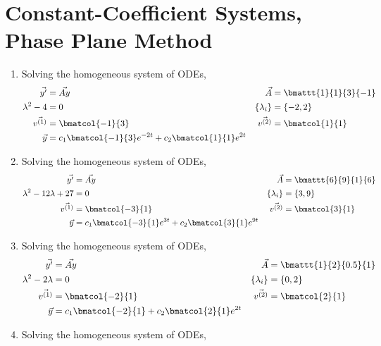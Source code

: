 \section{Constant-Coefficient Systems, Phase Plane Method}
\begin{enumerate}
\item Solving the homogeneous system of ODEs,
\begin{align}
    \vec{y'}        & = \vec{Ay}                   &
    \vec{A}         & = \bmattt{1}{1}{3}{-1}         \\
    \lambda^{2} - 4 & = 0                          &
    \{\lambda_i\}   & = \{-2, 2\}                    \\
    \vec{v^{(1)}}   & = \bmatcol{-1}{3}            &
    \vec{v^{(2)}}   & = \bmatcol{1}{1}               \\
    \vec{y}         & = c_1 \bmatcol{-1}{3}e^{-2t}
    + c_2 \bmatcol{1}{1} e^{2t}
\end{align}
\item Solving the homogeneous system of ODEs,
\begin{align}
    \vec{y'}                     & = \vec{Ay}                  &
    \vec{A}                      & = \bmattt{6}{9}{1}{6}         \\
    \lambda^{2} - 12\lambda + 27 & = 0                         &
    \{\lambda_i\}                & = \{3, 9\}                    \\
    \vec{v^{(1)}}                & = \bmatcol{-3}{1}           &
    \vec{v^{(2)}}                & = \bmatcol{3}{1}              \\
    \vec{y}                      & = c_1 \bmatcol{-3}{1}e^{3t}
    + c_2 \bmatcol{3}{1} e^{9t}
\end{align}
\item Solving the homogeneous system of ODEs,
\begin{align}
    \vec{y'}               & = \vec{Ay}              &
    \vec{A}                & = \bmattt{1}{2}{0.5}{1}   \\
    \lambda^{2} - 2\lambda & = 0                     &
    \{\lambda_i\}          & = \{0, 2\}                \\
    \vec{v^{(1)}}          & = \bmatcol{-2}{1}       &
    \vec{v^{(2)}}          & = \bmatcol{2}{1}          \\
    \vec{y}                & = c_1 \bmatcol{-2}{1}
    + c_2 \bmatcol{2}{1} e^{2t}
\end{align}
\item Solving the homogeneous system of ODEs,

\end{enumerate}
